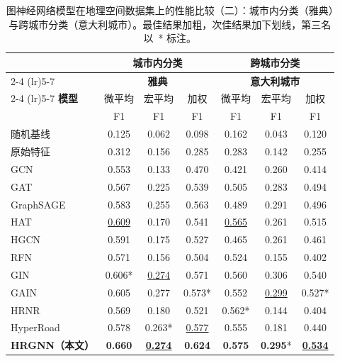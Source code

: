 \begin{table}[H]
\centering
\caption{图神经网络模型在地理空间数据集上的性能比较（二）：城市内分类（雅典）与跨城市分类（意大利城市）。最佳结果加粗，次佳结果加下划线，第三名以~* 标注。}
\label{tab:performance_b}
\begin{tabular}{@{}lcccccc@{}}
\toprule
& \multicolumn{3}{c}{\textbf{城市内分类}} & \multicolumn{3}{c}{\textbf{跨城市分类}} \\
\cmidrule(lr){2-4} \cmidrule(lr){5-7}
& \multicolumn{3}{c}{\textbf{雅典}} & \multicolumn{3}{c}{\textbf{意大利城市}} \\
\cmidrule(lr){2-4} \cmidrule(lr){5-7}
\textbf{模型} & 微平均 & 宏平均 & 加权 & 微平均 & 宏平均 & 加权 \\
& F1 & F1 & F1 & F1 & F1 & F1 \\
\midrule
随机基线 & 0.125 & 0.062 & 0.098 & 0.162 & 0.043 & 0.120 \\
原始特征 & 0.312 & 0.156 & 0.285 & 0.283 & 0.142 & 0.255 \\
\midrule
GCN       & 0.553             & 0.133             & 0.470             & 0.421             & 0.260             & 0.414 \\
GAT       & 0.567             & 0.225             & 0.539             & 0.505             & 0.283             & 0.494 \\
GraphSAGE & 0.583             & 0.255             & 0.563             & 0.489             & 0.291             & 0.496 \\
HAT       & \underline{0.609} & 0.170             & 0.541             & \underline{0.565} & 0.261             & 0.515 \\
HGCN      & 0.591             & 0.175             & 0.527             & 0.465             & 0.261             & 0.461 \\
RFN       & 0.571             & 0.156             & 0.504             & 0.524             & 0.155             & 0.402 \\
GIN       & 0.606*            & \underline{0.274} & 0.571             & 0.560             & 0.306             & 0.540 \\
GAIN      & 0.605             & 0.277             & 0.573*            & 0.552             & \underline{0.299} & 0.527* \\
HRNR      & 0.569             & 0.180             & 0.521             & 0.562*            & 0.144             & 0.404 \\
HyperRoad & 0.578             & 0.263*            & \underline{0.577} & 0.555             & 0.181             & 0.440 \\
\midrule
\textbf{HRGNN（本文）} & \textbf{0.660} & \underline{\textbf{0.274}} & \textbf{0.624} & \textbf{0.575} & \textbf{0.295}* & \underline{\textbf{0.534}} \\
\bottomrule
\end{tabular}
\end{table}


